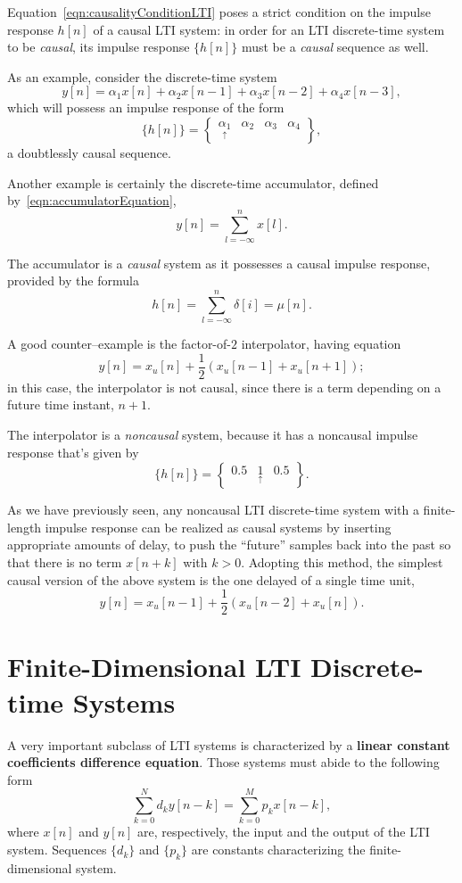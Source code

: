 \documentclass[\documentfontsize, twocolumn]{\classname}
\begin{document}
Equation~\ref{eqn:causalityConditionLTI} poses a strict condition on the impulse response $h[n]$ of a causal LTI system: in order for an LTI discrete-time system to be \emph{causal}, its impulse response $\{h[n]\}$ must be a \emph{causal} sequence as well.

As an example, consider the discrete-time system
\[
    y[n] = \alpha_1 x[n] + \alpha_2 x[n-1] + \alpha_3 x[n-2] + \alpha_4 x[n-3],
\]
which will possess an impulse response of the form
\[
    \{h[n]\} = \begin{Bmatrix}\underset{\uparrow}{\alpha_1} & \alpha_2 & \alpha_3 & \alpha_4\end{Bmatrix},
\]
a doubtlessly causal sequence.

Another example is certainly the discrete-time accumulator, defined by~\ref{eqn:accumulatorEquation},
\[
    y[n] = \sum_{l=-\infty}^{n} x[l].
\]

The accumulator is a \emph{causal} system as it possesses a causal impulse response, provided by the formula
\[
    h[n] = \sum_{l=-\infty}^{n} \delta[i] =\mu[n].
\]

A good counter--example is the factor-of-$2$ interpolator, having equation
\[
    y[n] = x_u[n] + \frac 1 2(x_u[n-1] + x_u[n+1]);
\]
in this case, the interpolator is not causal, since there is a term depending on
a future time instant, $n+1$.

The interpolator is a \emph{noncausal} system, because it has a noncausal impulse response that's given by
\[
    \{h[n]\} = \begin{Bmatrix} 0.5 & \underset{\uparrow}{1} & 0.5\end{Bmatrix}.
\]

As we have previously seen, any noncausal LTI discrete-time system with a finite-length impulse response can be realized as causal systems by inserting appropriate amounts of delay, to push the ``future'' samples back into the past so that there is no term $x[n+k]$ with $k>0$. Adopting this method, the simplest causal version of the above system is the one delayed of a single time unit,
\[
    y[n] = x_u[n-1] + \frac 1 2(x_u[n-2] + x_u[n]).
\]

\section{Finite-Dimensional LTI Discrete-time Systems}
A very important subclass of LTI systems is characterized by a \textbf{linear
constant coefficients difference equation}. Those systems must abide to the
following form
\begin{equation}\label{eqn:finiteDimensionalLtiSystems}
    \sum_{k=0}^N d_k y[n-k] = \sum_{k=0}^M p_k x[n-k],
\end{equation}
where $x[n]$ and $y[n]$ are, respectively, the input and the output of the LTI
system. Sequences $\{d_k\}$ and $\{p_k\}$ are constants characterizing the
finite-dimensional system.
\end{document}
